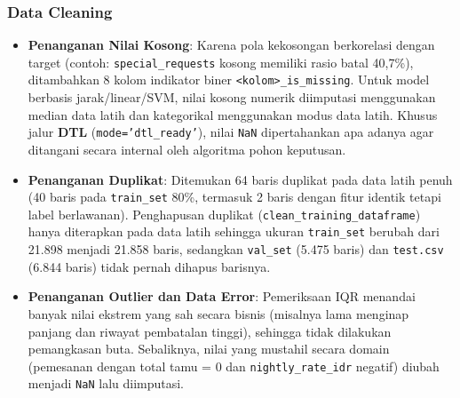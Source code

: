\documentclass[11pt,a4paper]{article}
\numberwithin{figure}{section}
\numberwithin{table}{section}
\begin{document}
\subsubsection{Data Cleaning}
\begin{itemize}[leftmargin=1.2cm, itemsep=2pt]
  \item \textbf{Penanganan Nilai Kosong}: Karena pola kekosongan berkorelasi dengan target (contoh: \texttt{special\_requests} kosong memiliki rasio batal 40,7\%), ditambahkan 8 kolom indikator biner \texttt{<kolom>\_is\_missing}. Untuk model berbasis jarak/linear/SVM, nilai kosong numerik diimputasi menggunakan median data latih dan kategorikal menggunakan modus data latih. Khusus jalur \textbf{DTL} (\texttt{mode='dtl\_ready'}), nilai \texttt{NaN} dipertahankan apa adanya agar ditangani secara internal oleh algoritma pohon keputusan.
  \item \textbf{Penanganan Duplikat}: Ditemukan 64 baris duplikat pada data latih penuh (40 baris pada \texttt{train\_set} 80\%, termasuk 2 baris dengan fitur identik tetapi label berlawanan). Penghapusan duplikat (\texttt{clean\_training\_dataframe}) hanya diterapkan pada data latih sehingga ukuran \texttt{train\_set} berubah dari 21.898 menjadi 21.858 baris, sedangkan \texttt{val\_set} (5.475 baris) dan \texttt{test.csv} (6.844 baris) tidak pernah dihapus barisnya.
  \item \textbf{Penanganan Outlier dan Data Error}: Pemeriksaan IQR menandai banyak nilai ekstrem yang sah secara bisnis (misalnya lama menginap panjang dan riwayat pembatalan tinggi), sehingga tidak dilakukan pemangkasan buta. Sebaliknya, nilai yang mustahil secara domain (pemesanan dengan total tamu = 0 dan \texttt{nightly\_rate\_idr} negatif) diubah menjadi \texttt{NaN} lalu diimputasi.
\end{itemize}
\end{document}
